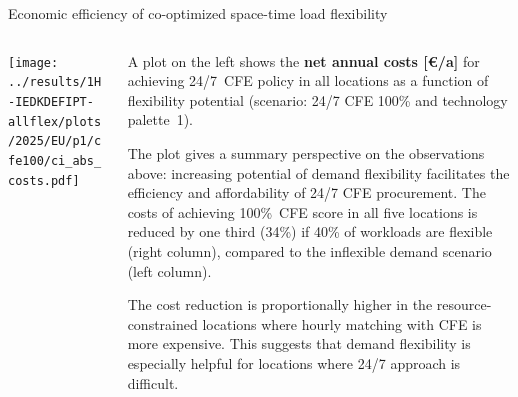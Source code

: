 \begin{frame}{Economic efficiency of co-optimized space-time load flexibility}

  {\footnotesize
  \vspace{0.2cm}
  
  \begin{columns}
  \begin{column}{8cm}
  \centering
  \vspace{0.2cm}
  \texttt{[image: ../results/1H-IEDKDEFIPT-allflex/plots/2025/EU/p1/cfe100/ci\_abs\_costs.pdf]}
  \end{column}
  
  \begin{column}{7cm}
    A plot on the left shows the {\bf net annual costs [\euro/a]} for achieving 24/7~CFE policy in all locations as a function of flexibility potential (scenario: 24/7 CFE 100\% and technology palette~1). 
    
    \vspace{0.1cm} 
    The plot gives a summary perspective on the observations above: increasing potential of demand flexibility facilitates the \alert{efficiency and affordability} of 24/7 CFE procurement. The costs of achieving 100\%~CFE score in all five locations is reduced by \alert{one third (34\%)} if 40\% of workloads are flexible (right column), compared to the inflexible demand scenario (left column).

    \vspace{0.1cm} 
    The cost reduction is proportionally higher in the resource-constrained locations where hourly matching with CFE is more expensive. This suggests that demand flexibility is especially helpful for locations where 24/7 approach is difficult.

    \end{column}
  \end{columns}
  
  }
\end{frame}


